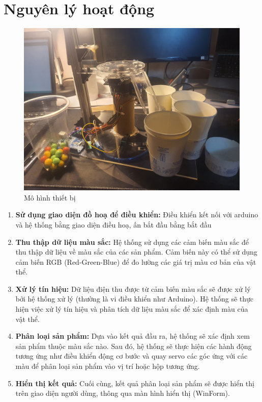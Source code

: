 \documentclass[12pt]{report}
\begin{document}
\section{Nguyên lý hoạt động}
    \begin{figure}[H]
        \centering
        \includegraphics[width=1\linewidth]{image/mohinh.jpg}
        \caption{Mô hình thiết bị}
    \end{figure}
    
    \begin{enumerate}[label=\arabic*., itemsep=0pt, parsep=0pt]
        \item \textbf{Sử dụng giao diện đồ hoạ để điều khiển:} Điều khiển kết nối với arduino và hệ thống bằng giao diện điều hoạ, ấn bắt đầu bằng bắt đầu 
        \item \textbf{Thu thập dữ liệu màu sắc:} Hệ thống sử dụng các cảm biến màu sắc để thu thập dữ liệu về màu sắc của các sản phẩm. Cảm biến này có thể sử dụng cảm biến RGB (Red-Green-Blue) để đo lường các giá trị màu cơ bản của vật thể.
        
        
        \item \textbf{Xử lý tín hiệu:} Dữ liệu điện thu được từ cảm biến màu sắc sẽ được xử lý bởi hệ thống xử lý (thường là vi điều khiển như Arduino). Hệ thống sẽ thực hiện việc xử lý tín hiệu và phân tích dữ liệu màu sắc để xác định màu của vật thể.
        
        \item \textbf{Phân loại sản phẩm:} Dựa vào kết quả đầu ra, hệ thống sẽ xác định xem sản phẩm thuộc màu sắc nào. Sau đó, hệ thống sẽ thực hiện các hành động tương ứng như điều khiển động cơ bước và quay servo các góc ứng với các màu để phân loại sản phẩm vào vị trí hoặc hộp tương ứng.
        
        \item \textbf{Hiển thị kết quả:} Cuối cùng, kết quả phân loại sản phẩm sẽ được hiển thị trên giao diện người dùng, thông qua màn hình hiển thị (WinForm).
    
    \end{enumerate}
\end{document}
